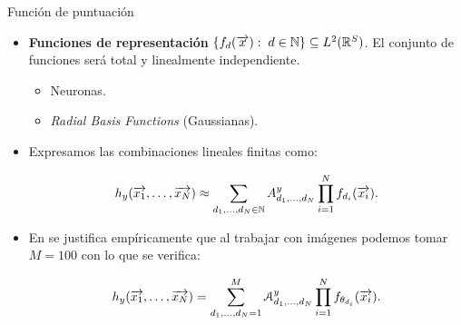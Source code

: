 \begin{frame}{Función de puntuación}

	\begin{itemize}
		\item \textbf{Funciones de representación} $\{ f_d(\overrightarrow{x}): \; d \in \mathbb{N} \} \subseteq L^2(\mathbb{R}^S)$. El conjunto de funciones será total y linealmente independiente.
		      \begin{itemize}
			      \item Neuronas.
			      \item \textit{Radial Basis Functions} (Gaussianas).
		      \end{itemize}
		\item Expresamos las combinaciones lineales finitas como:

		      \begin{equation} \label{eq:hipotesis_en_general}
			      h_y(\overrightarrow{x_1}, \ldots, \overrightarrow{x_N}) \approx \sum_{d_1, \ldots, d_N \in \mathbb{N}} A^y_{d_1, \ldots, d_N} \prod_{i = 1}^N f_{d_i}(\overrightarrow{x_i}).
		      \end{equation}
		\item En \cite{matematicas:principal} se justifica empíricamente que al trabajar con imágenes podemos tomar $M=100$ con lo que se verifica:

		      \begin{equation} \label{eq:puntuacion_general}
			      h_y(\overrightarrow{x_1}, \ldots, \overrightarrow{x_N}) = \sum_{d_1, \ldots, d_N = 1}^{M} \mathcal{A}^y_{d_1, \ldots, d_N} \prod_{i = 1}^N f_{\theta_{d_i}}(\overrightarrow{x_i}).
		      \end{equation}
	\end{itemize}

\end{frame}

